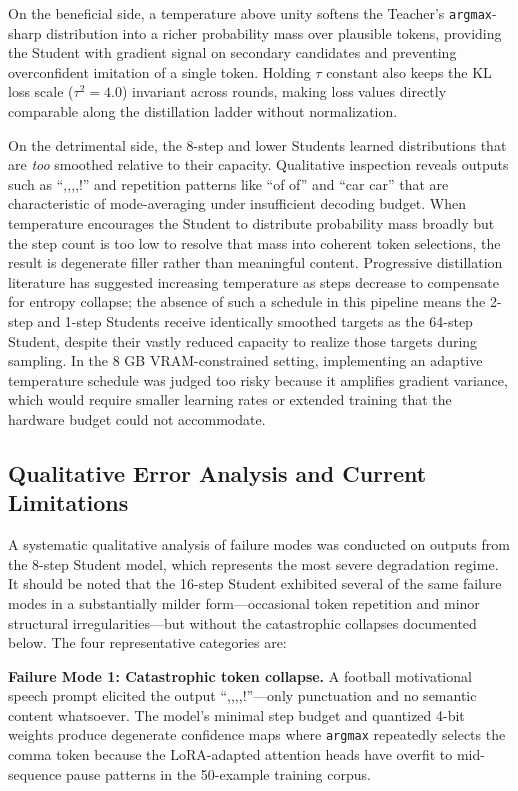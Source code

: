 \documentclass[11pt, a4paper]{article}
\begin{document}
On the beneficial side, a temperature above unity softens the Teacher's \texttt{argmax}-sharp distribution into a richer probability mass over plausible tokens, providing the Student with gradient signal on secondary candidates and preventing overconfident imitation of a single token. Holding $\tau$ constant also keeps the KL loss scale ($\tau^2 = 4.0$) invariant across rounds, making loss values directly comparable along the distillation ladder without normalization.

On the detrimental side, the 8-step and lower Students learned distributions that are \emph{too} smoothed relative to their capacity. Qualitative inspection reveals outputs such as ``,,,,!'' and repetition patterns like ``of of'' and ``car car'' that are characteristic of mode-averaging under insufficient decoding budget. When temperature encourages the Student to distribute probability mass broadly but the step count is too low to resolve that mass into coherent token selections, the result is degenerate filler rather than meaningful content. Progressive distillation literature has suggested increasing temperature as steps decrease to compensate for entropy collapse; the absence of such a schedule in this pipeline means the 2-step and 1-step Students receive identically smoothed targets as the 64-step Student, despite their vastly reduced capacity to realize those targets during sampling. In the 8 GB VRAM-constrained setting, implementing an adaptive temperature schedule was judged too risky because it amplifies gradient variance, which would require smaller learning rates or extended training that the hardware budget could not accommodate.

\subsection{Qualitative Error Analysis and Current Limitations}
\label{subsec:error_analysis}

A systematic qualitative analysis of failure modes was conducted on outputs from the 8-step Student model, which represents the most severe degradation regime. It should be noted that the 16-step Student exhibited several of the same failure modes in a substantially milder form---occasional token repetition and minor structural irregularities---but without the catastrophic collapses documented below. The four representative categories are:

\textbf{Failure Mode 1: Catastrophic token collapse.} A football motivational speech prompt elicited the output ``,,,,!''---only punctuation and no semantic content whatsoever. The model's minimal step budget and quantized 4-bit weights produce degenerate confidence maps where \texttt{argmax} repeatedly selects the comma token because the LoRA-adapted attention heads have overfit to mid-sequence pause patterns in the 50-example training corpus.
\end{document}
